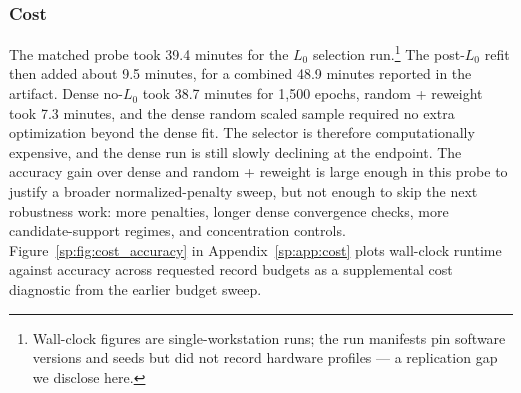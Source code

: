 \subsubsection{Cost}

The matched probe took 39.4 minutes for the $L_0$ selection run.\footnote{Wall-clock figures are single-workstation runs; the run manifests pin software versions and seeds but did not record hardware profiles --- a replication gap we disclose here.} The post-$L_0$ refit then added about
9.5 minutes, for a combined 48.9 minutes reported in the artifact. Dense no-$L_0$ took 38.7 minutes for
1{,}500 epochs, random + reweight took 7.3 minutes, and the dense random scaled sample required no extra
optimization beyond the dense fit. The selector is therefore computationally expensive, and the dense run
is still slowly declining at the endpoint. The accuracy gain over dense and random + reweight is large
enough in this probe to justify a broader normalized-penalty sweep, but not enough to skip the next
robustness work: more penalties, longer dense convergence checks, more candidate-support regimes, and
concentration controls. Figure~\ref{sp:fig:cost_accuracy} in Appendix~\ref{sp:app:cost} plots wall-clock
runtime against accuracy across requested record budgets as a supplemental cost diagnostic from the
earlier budget sweep.
